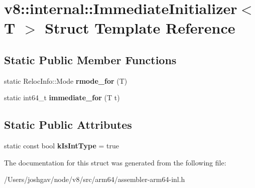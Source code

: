 \hypertarget{structv8_1_1internal_1_1_immediate_initializer}{}\section{v8\+:\+:internal\+:\+:Immediate\+Initializer$<$ T $>$ Struct Template Reference}
\label{structv8_1_1internal_1_1_immediate_initializer}
\subsection*{Static Public Member Functions}
\begin{DoxyCompactItemize}
\item 
static Reloc\+Info\+::\+Mode {\bfseries rmode\+\_\+for} (T)\hypertarget{structv8_1_1internal_1_1_immediate_initializer_a844c902980afb8efddc3cb4c54d849f7}{}\label{structv8_1_1internal_1_1_immediate_initializer_a844c902980afb8efddc3cb4c54d849f7}

\item 
static int64\+\_\+t {\bfseries immediate\+\_\+for} (T t)\hypertarget{structv8_1_1internal_1_1_immediate_initializer_a75cc19b5515e530e2a4b1b5cc84ec29a}{}\label{structv8_1_1internal_1_1_immediate_initializer_a75cc19b5515e530e2a4b1b5cc84ec29a}

\end{DoxyCompactItemize}
\subsection*{Static Public Attributes}
\begin{DoxyCompactItemize}
\item 
static const bool {\bfseries k\+Is\+Int\+Type} = true\hypertarget{structv8_1_1internal_1_1_immediate_initializer_a11c7f92fe5114961edba9b85a1b48ef1}{}\label{structv8_1_1internal_1_1_immediate_initializer_a11c7f92fe5114961edba9b85a1b48ef1}

\end{DoxyCompactItemize}


The documentation for this struct was generated from the following file\+:\begin{DoxyCompactItemize}
\item 
/\+Users/joshgav/node/v8/src/arm64/assembler-\/arm64-\/inl.\+h\end{DoxyCompactItemize}
